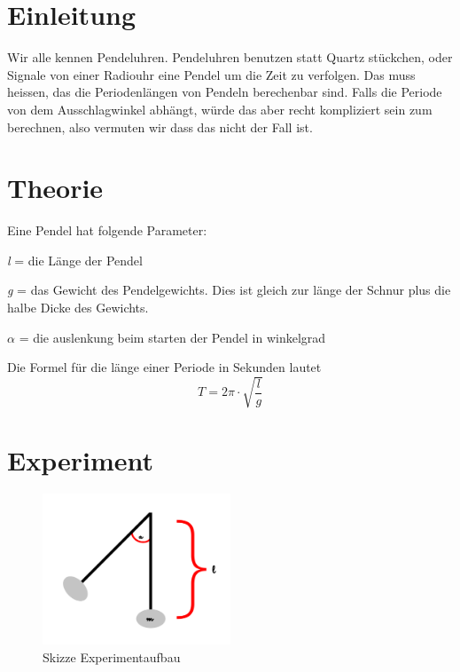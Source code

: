 \documentclass[12pt, a4paper, twoside]{article}
\begin{document}
\maketitlepage



\section{Einleitung}
Wir alle kennen Pendeluhren.
Pendeluhren benutzen statt Quartz stückchen, oder Signale von einer Radiouhr eine Pendel um die Zeit zu verfolgen.
Das muss heissen, das die Periodenlängen von Pendeln berechenbar sind.
Falls die Periode von dem Ausschlagwinkel abhängt, würde das aber recht kompliziert sein zum berechnen, also vermuten wir dass das nicht der Fall ist.

\section{Theorie}
Eine Pendel hat folgende Parameter:
\begin{list}{-}{}
  \item \emph{l} = die Länge der Pendel
  \item \emph{g} = das Gewicht des Pendelgewichts. Dies ist gleich zur länge der Schnur plus die halbe Dicke des Gewichts.
  \item \emph{$\alpha$} = die auslenkung beim starten der Pendel in winkelgrad
\end{list}

Die Formel für die länge einer Periode in Sekunden lautet
$$T=2\pi\cdot\sqrt{\frac{l}{g}}$$
\cite{FoTa}

\section{Experiment}
\begin{figure} [ht]
  \centering
  \includegraphics[width=0.5\textwidth]{Experimentaufbau.png}
  \caption{Skizze Experimentaufbau}
  \label{fig:experimentaufbau}
\end{figure}
\end{document}
